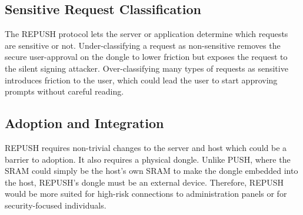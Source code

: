 \subsection{Sensitive Request Classification}
The REPUSH protocol lets the server or application determine which requests are sensitive or not. Under-classifying a request as non-sensitive removes the secure user-approval on the dongle to lower friction but exposes the request to the silent signing attacker. Over-classifying many types of requests as sensitive introduces friction to the user, which could lead the user to start approving prompts without careful reading. 

\subsection{Adoption and Integration}
REPUSH requires non-trivial changes to the server and host which could be a barrier to adoption. It also requires a physical dongle. Unlike PUSH, where the SRAM could simply be the host's own SRAM to make the dongle embedded into the host, REPUSH's dongle must be an external device. Therefore, REPUSH would be more suited for high-risk connections to administration panels or for security-focused individuals.

